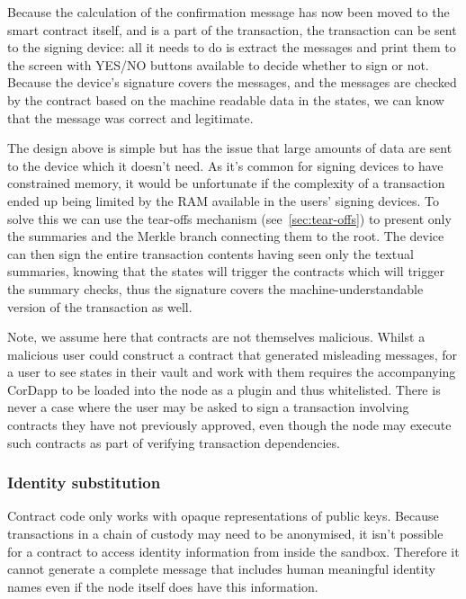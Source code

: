 \documentclass{article}
\begin{document}
Because the calculation of the confirmation message has now been moved to the smart contract itself, and is a part
of the transaction, the transaction can be sent to the signing device: all it needs to do is extract the messages
and print them to the screen with YES/NO buttons available to decide whether to sign or not. Because the device's
signature covers the messages, and the messages are checked by the contract based on the machine readable data in
the states, we can know that the message was correct and legitimate.

The design above is simple but has the issue that large amounts of data are sent to the device which it doesn't
need. As it's common for signing devices to have constrained memory, it would be unfortunate if the complexity of a
transaction ended up being limited by the RAM available in the users' signing devices. To solve this we can use the
tear-offs mechanism (see~\cref{sec:tear-offs}) to present only the summaries and the Merkle branch connecting them
to the root. The device can then sign the entire transaction contents having seen only the textual summaries,
knowing that the states will trigger the contracts which will trigger the summary checks, thus the signature covers
the machine-understandable version of the transaction as well.

Note, we assume here that contracts are not themselves malicious. Whilst a malicious user could construct a
contract that generated misleading messages, for a user to see states in their vault and work with them requires
the accompanying CorDapp to be loaded into the node as a plugin and thus whitelisted. There is never a case where
the user may be asked to sign a transaction involving contracts they have not previously approved, even though the
node may execute such contracts as part of verifying transaction dependencies.

\subsubsection{Identity substitution}

Contract code only works with opaque representations of public keys. Because transactions in a chain of custody may
need to be anonymised, it isn't possible for a contract to access identity information from inside the sandbox.
Therefore it cannot generate a complete message that includes human meaningful identity names even if the node
itself does have this information.
\end{document}

